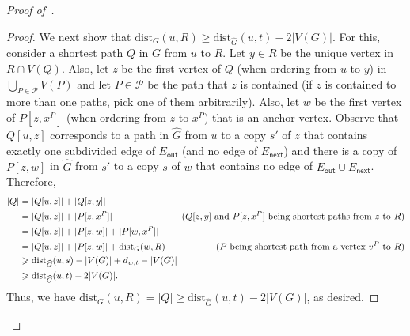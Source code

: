 \documentclass[11pt,a4paper]{article}
\newcommand{\dist}{\mathrm{dist}}
\renewcommand{\ge}{\geqslant}
\begin{document}
\begin{proof}[Proof of~]
\begin{proof}
    We next show that $\dist_G(u,R)\ge \dist_{\widehat{G}}(u,t) - 2|V(G)|$.
    For this, consider a shortest path $Q$ in $G$ from $u$ to $R$. Let $y\in R$ be the unique vertex in $R\cap V(Q)$.
    Also, let $z$ be the first vertex of $Q$ (when ordering from $u$ to $y$)
    in $\bigcup_{P\in\mathcal{P}}V(P)$ and let $P\in\mathcal{P}$ be the path that $z$ is contained
    (if $z$ is contained to more than one paths, pick one of them arbitrarily).
    Also, let $w$ be the first vertex of $P[z,x^P]$ (when ordering from $z$ to $x^P$) that is an anchor vertex.
    Observe that $Q[u,z]$ corresponds to a path in $\widehat{G}$ from $u$ to a copy $s'$ of $z$
    that contains exactly one subdivided edge of $E_{\mathsf{out}}$ (and no edge of $E_{\mathsf{next}}$)
    and there is a copy of $P[z,w]$ in $\widehat{G}$ from $s'$ to a copy $s$ of $w$ 
    that contains no edge of $E_{\mathsf{out}} \cup E_{\mathsf{next}}$. 
    Therefore,
    \begin{align*}
      |Q| & = |Q[u,z]|+|Q[z,y]|& \\
      & = |Q[u,z]|+ |P[z,x^P]| & \text{\!\!\!($Q[z,y]$ and $P[z,x^P]$ being shortest paths from $z$ to $R$)}\\
      & = |Q[u,z]|+ |P[z,w]| + |P[w,x^P]|& \\
      & = |Q[u,z]|+ |P[z,w]| + \dist_G(w,R) & \text{($P$ being shortest path from a vertex $v^P$ to $R$)}\\
      & \ge \dist_{\widehat{G}}(u,s) - |V(G)| + d_{w,t} - |V(G)|& \\
      & \ge \dist_{\widehat{G}}(u,t) - 2|V(G)|. &  
    \end{align*} 
    Thus, we have $\dist_G(u,R) = |Q| \ge \dist_{\widehat{G}}(u,t)-2|V(G)|$, as desired.
  \end{proof}


\end{proof}
\end{document}
